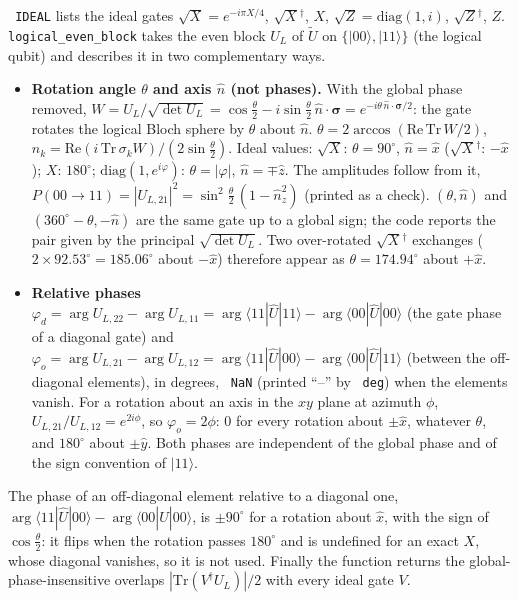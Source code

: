 \documentclass[11pt]{article}
\renewenvironment{function}[1]{\par\Needspace{7\baselineskip}\medskip\noindent{\raggedright\textbf{\large\texttt{\hyphenchar\font=-1 #1}}\par}\nopagebreak}{\par\medskip}
\renewcommand{\code}[1]{\texttt{\hyphenchar\font=-1 #1}}
\newcommand{\ket}[1]{|#1\rangle}
\newcommand{\bra}[1]{\langle#1|}
\begin{document}
\begin{function}{IDEAL, logical\_even\_block(Ũ), deg(x)}
\code{IDEAL} lists the ideal gates $\sqrt X = e^{-i\pi X/4}$, $\sqrt{X}{}^\dagger$, $X$, $\sqrt Z = \mathrm{diag}(1, i)$, $\sqrt{Z}{}^\dagger$, $Z$.
\code{logical\_even\_block} takes the even block $U_L$ of $\tilde U$ on $\{\ket{00},\ket{11}\}$ (the logical qubit) and describes it in two
complementary ways.
\begin{itemize}
\item \textbf{Rotation angle $\theta$ and axis $\hat n$ (not phases).} With the global phase removed,
$W = U_L/\sqrt{\det U_L} = \cos\frac\theta2 - i\sin\frac\theta2\,\hat n\cdot\boldsymbol\sigma = e^{-i\theta\,\hat n\cdot\boldsymbol\sigma/2}$: the gate rotates the
logical Bloch sphere by $\theta$ about $\hat n$. $\theta = 2\arccos(\mathrm{Re}\,\mathrm{Tr}\,W/2)$, $\hat n_k = \mathrm{Re}(i\,\mathrm{Tr}\,\sigma_kW)/(2\sin\frac\theta2)$.
Ideal values: $\sqrt X$: $\theta = 90^\circ$, $\hat n = \hat x$ ($\sqrt{X}{}^\dagger$: $-\hat x$); $X$: $180^\circ$; $\mathrm{diag}(1, e^{i\varphi})$: $\theta = |\varphi|$,
$\hat n = \mp\hat z$. The amplitudes follow from it, $P(00\to11) = |U_{L,21}|^2 = \sin^2\frac\theta2\,(1 - \hat n_z^2)$ (printed as a check).
$(\theta, \hat n)$ and $(360^\circ - \theta, -\hat n)$ are the same gate up to a global sign; the code reports the pair given by the principal
$\sqrt{\det U_L}$. Two over-rotated $\sqrt{X}{}^\dagger$ exchanges ($2\times92.53^\circ = 185.06^\circ$ about $-\hat x$) therefore appear as
$\theta = 174.94^\circ$ about $+\hat x$.
\item \textbf{Relative phases} $\varphi_d = \arg U_{L,22} - \arg U_{L,11} = \arg\bra{11}\hat U\ket{11} - \arg\bra{00}\hat U\ket{00}$ (the gate phase of a
diagonal gate) and $\varphi_o = \arg U_{L,21} - \arg U_{L,12} = \arg\bra{11}\hat U\ket{00} - \arg\bra{00}\hat U\ket{11}$ (between the off-diagonal elements),
in degrees, \code{NaN} (printed ``--'' by \code{deg}) when the elements vanish. For a rotation about an axis in the $xy$ plane at azimuth
$\phi$, $U_{L,21}/U_{L,12} = e^{2i\phi}$, so $\varphi_o = 2\phi$: $0$ for every rotation about $\pm\hat x$, whatever $\theta$, and $180^\circ$ about $\pm\hat y$.
Both phases are independent of the global phase and of the sign convention of $\ket{11}$.
\end{itemize}
The phase of an off-diagonal element relative to a diagonal one, $\arg\bra{11}\hat U\ket{00} - \arg\bra{00}\hat U\ket{00}$, is $\pm90^\circ$ for a rotation
about $\hat x$, with the sign of $\cos\frac\theta2$: it flips when the rotation passes $180^\circ$ and is undefined for an exact $X$, whose diagonal
vanishes, so it is not used. Finally the function returns the global-phase-insensitive overlaps $|\mathrm{Tr}(V^\dagger U_L)|/2$ with every ideal gate $V$.
\end{function}
\end{document}

